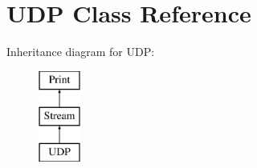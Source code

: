 \hypertarget{class_u_d_p}{\section{U\-D\-P Class Reference}
\label{class_u_d_p}
}
Inheritance diagram for U\-D\-P\-:\begin{figure}[H]
\begin{center}
\leavevmode
\includegraphics[height=3.000000cm]{class_u_d_p}
\end{center}
\end{figure}
